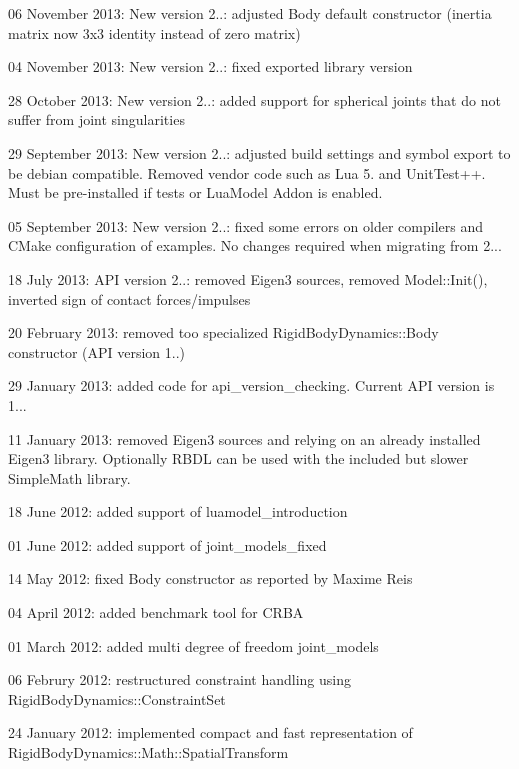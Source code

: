 06 November 2013\+: New version 2..\+: adjusted Body default constructor (inertia matrix now 3x3 identity instead of zero matrix)
\begin{DoxyItemize}
\item 04 November 2013\+: New version 2..\+: fixed exported library version
\item 28 October 2013\+: New version 2..\+: added support for spherical joints that do not suffer from joint singularities
\item 29 September 2013\+: New version 2..\+: adjusted build settings and symbol export to be debian compatible. Removed vendor code such as Lua 5. and Unit\+Test++. Must be pre-\/installed if tests or Lua\+Model Addon is enabled.
\item 05 September 2013\+: New version 2..\+: fixed some errors on older compilers and C\+Make configuration of examples. No changes required when migrating from 2...
\item 18 July 2013\+: A\+P\+I version 2..\+: removed Eigen3 sources, removed Model\+::\+Init(), inverted sign of contact forces/impulses
\item 20 February 2013\+: removed too specialized Rigid\+Body\+Dynamics\+::\+Body constructor (A\+P\+I version 1..)
\item 29 January 2013\+: added code for api\+\_\+version\+\_\+checking. Current A\+P\+I version is 1...
\item 11 January 2013\+: removed Eigen3 sources and relying on an already installed Eigen3 library. Optionally R\+B\+D\+L can be used with the included but slower Simple\+Math library.
\item 18 June 2012\+: added support of luamodel\+\_\+introduction
\item 01 June 2012\+: added support of joint\+\_\+models\+\_\+fixed
\item 14 May 2012\+: fixed Body constructor as reported by Maxime Reis
\item 04 April 2012\+: added benchmark tool for C\+R\+B\+A
\item 01 March 2012\+: added multi degree of freedom joint\+\_\+models
\item 06 Februry 2012\+: restructured constraint handling using Rigid\+Body\+Dynamics\+::\+Constraint\+Set
\item 24 January 2012\+: implemented compact and fast representation of Rigid\+Body\+Dynamics\+::\+Math\+::\+Spatial\+Transform
\end{DoxyItemize}


